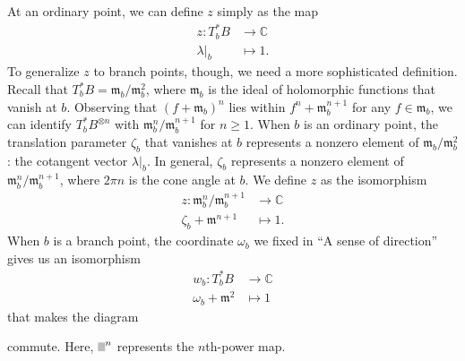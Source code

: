 \documentclass{article}
\newcommand{\maps}{\colon}
\newcommand{\C}{\mathbb{C}}
\newcommand{\blankbox}{{\fboxsep 0pt \colorbox{lightgray}{\phantom{$h$}}}}
\newcommand{\van}{\mathfrak{m}}
\theoremstyle{definition}
\theoremstyle{plain}
\begin{document}
At an ordinary point, we can define $z$ simply as the map
\begin{align*}
z \maps T^*_bB & \to \C \\
\lambda\big|_b & \mapsto 1.
\end{align*}
To generalize $z$ to branch points, though, we need a more sophisticated definition. Recall that $T^*_bB = \van_b / \van_b^2$, where $\van_b$ is the ideal of holomorphic functions that vanish at $b$. Observing that $(f + \van_b)^n$ lies within $f^n + \van_b^{n+1}$ for any $f \in \van_b$, we can identify $T^*_bB^{\otimes n}$ with $\van_b^n / \van_b^{n+1}$ for $n \ge 1$. When $b$ is an ordinary point, the translation parameter $\zeta_b$ that vanishes at $b$ represents a nonzero element of $\van_b / \van_b^2$: the cotangent vector $\lambda\big|_b$. In general, $\zeta_b$ represents a nonzero element of $\van_b^n / \van_b^{n+1}$, where $2\pi n$ is the cone angle at $b$. We define $z$ as the isomorphism
\begin{align*}
z \maps \van_b^n / \van_b^{n+1} & \to \C \\
\zeta_b + \van^{n+1} & \mapsto 1.
\end{align*}
When $b$ is a branch point, the coordinate $\omega_b$ we fixed in ``A sense of direction'' gives us an isomorphism
\begin{align*}
w_b \maps T^*_bB & \to \C \\
\omega_b + \van^2 & \mapsto 1
\end{align*}
that makes the diagram
\begin{center}
\end{center}
commute. Here, $\blankbox^n$ represents the $n$th-power map.
%
\end{document}

